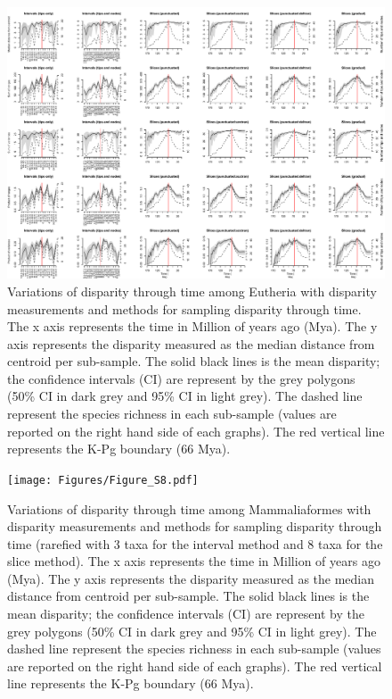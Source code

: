 \documentclass[12pt,letterpaper]{article}
\begin{document}
\begin{landscape}
\begin{figure}[!htbp]
\centering
    \includegraphics[width=\textwidth,height=\textheight,keepaspectratio]{Figures/Figure_S7.pdf}
\caption{\scriptsize{Variations of disparity through time among Eutheria with disparity measurements and methods for sampling disparity through time. The x axis represents the time in Million of years ago (Mya). The y axis represents the disparity measured as the median distance from centroid per sub-sample. The solid black lines is the mean disparity; the confidence intervals (CI) are represent by the grey polygons (50\% CI in dark grey and 95\% CI in light grey). The dashed line represent the species richness in each sub-sample (values are reported on the right hand side of each graphs). The red vertical line represents the K-Pg boundary (66 Mya).}}
\end{figure}
\end{landscape}

\begin{landscape}
\begin{figure}[!htbp]
\centering
    \texttt{[image: Figures/Figure\_S8.pdf]}
\caption{\scriptsize{Variations of disparity through time among Mammaliaformes with disparity measurements and methods for sampling disparity through time (rarefied with 3 taxa for the interval method and 8 taxa for the slice method). The x axis represents the time in Million of years ago (Mya). The y axis represents the disparity measured as the median distance from centroid per sub-sample. The solid black lines is the mean disparity; the confidence intervals (CI) are represent by the grey polygons (50\% CI in dark grey and 95\% CI in light grey). The dashed line represent the species richness in each sub-sample (values are reported on the right hand side of each graphs). The red vertical line represents the K-Pg boundary (66 Mya).}}
\end{figure}
\end{landscape}
\end{document}
